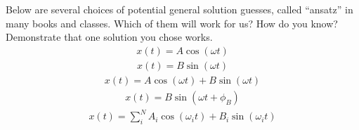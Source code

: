 \documentclass[letterpaper,10pt,english]{jupyterBook}
\begin{document}
\sphinxAtStartPar
Below are several choices of potential general solution guesses, called “ansatz” in many books and classes. Which of them will work for us? How do you know?  Demonstrate that one solution you chose works.
\begin{equation*}
\begin{split}x(t) = A\cos(\omega t)\end{split}
\end{equation*}\begin{equation*}
\begin{split}x(t) = B\sin(\omega t)\end{split}
\end{equation*}\begin{equation*}
\begin{split}x(t) = A\cos(\omega t)+B\sin(\omega t)\end{split}
\end{equation*}\begin{equation*}
\begin{split}x(t) = B\sin(\omega t+ \phi_B)\end{split}
\end{equation*}\begin{equation*}
\begin{split}x(t) = \sum_i^N A_i\cos(\omega_i t) + B_i\sin(\omega_i t)\end{split}
\end{equation*}
\sphinxAtStartPar
{}
\end{document}
